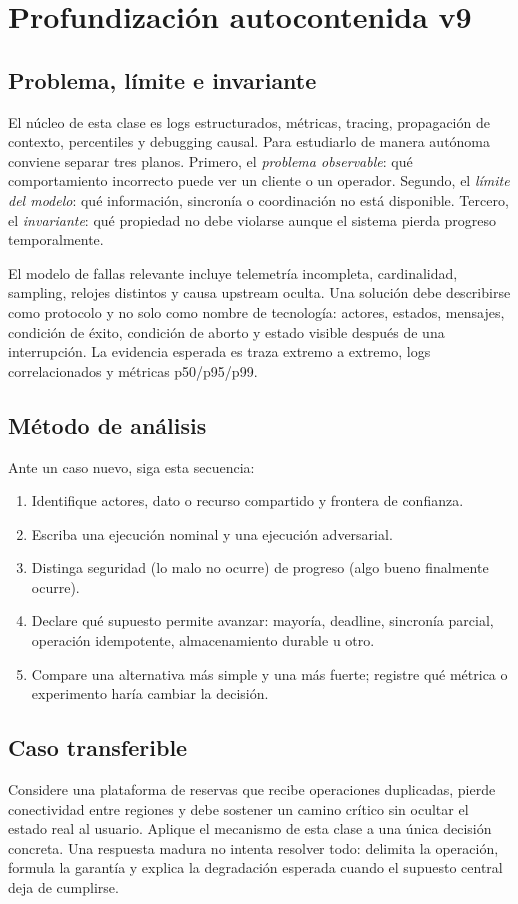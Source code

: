 \documentclass[variant=apuntes,cover=institutional,mode=screen]{ua-engineering-v6-article}
\begin{document}
\section{Profundización autocontenida v9}
\subsection{Problema, límite e invariante}
El núcleo de esta clase es logs estructurados, métricas, tracing, propagación de contexto, percentiles y debugging causal. Para estudiarlo de manera autónoma conviene separar tres planos. Primero, el \emph{problema observable}: qué comportamiento incorrecto puede ver un cliente o un operador. Segundo, el \emph{límite del modelo}: qué información, sincronía o coordinación no está disponible. Tercero, el \emph{invariante}: qué propiedad no debe violarse aunque el sistema pierda progreso temporalmente.

El modelo de fallas relevante incluye telemetría incompleta, cardinalidad, sampling, relojes distintos y causa upstream oculta. Una solución debe describirse como protocolo y no solo como nombre de tecnología: actores, estados, mensajes, condición de éxito, condición de aborto y estado visible después de una interrupción. La evidencia esperada es traza extremo a extremo, logs correlacionados y métricas p50/p95/p99.

\subsection{Método de análisis}
Ante un caso nuevo, siga esta secuencia:
\begin{enumerate}
\item Identifique actores, dato o recurso compartido y frontera de confianza.
\item Escriba una ejecución nominal y una ejecución adversarial.
\item Distinga seguridad (lo malo no ocurre) de progreso (algo bueno finalmente ocurre).
\item Declare qué supuesto permite avanzar: mayoría, deadline, sincronía parcial, operación idempotente, almacenamiento durable u otro.
\item Compare una alternativa más simple y una más fuerte; registre qué métrica o experimento haría cambiar la decisión.
\end{enumerate}

\subsection{Caso transferible}
Considere una plataforma de reservas que recibe operaciones duplicadas, pierde conectividad entre regiones y debe sostener un camino crítico sin ocultar el estado real al usuario. Aplique el mecanismo de esta clase a una única decisión concreta. Una respuesta madura no intenta resolver todo: delimita la operación, formula la garantía y explica la degradación esperada cuando el supuesto central deja de cumplirse.
\end{document}

